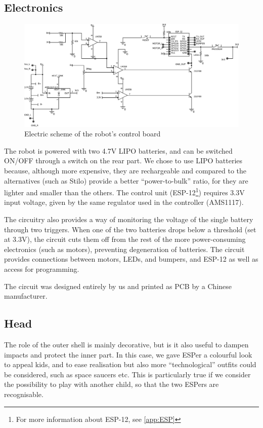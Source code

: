 \documentclass[a4paper,twoside]{book}
\begin{document}
\subsection{Electronics}

\begin{figure}[h]
\includegraphics[width=\textwidth]{img/ProgettoCircuito_bw}
\caption{Electric scheme of the robot's control board}
\label{fig:robot_circ}
\end{figure}

The robot is powered with two 4.7V LIPO batteries, and can be switched ON/OFF through a switch on the rear part. We chose to use LIPO batteries because, although more expensive, they are rechargeable and \textemdash{} compared to the alternatives (such as Stilo) \textemdash{} provide a better \textquotedblleft{}power-to-bulk\textquotedblright{}  ratio, for they are lighter and smaller than the others.
The control unit (ESP-12\footnote{For more information about ESP-12, see \autoref{app:ESP}}) requires 3.3V input voltage, given by the same regulator used in the controller (AMS1117).

The circuitry also provides a way of monitoring the voltage of the single battery through two triggers. When one of the two batteries drops below a threshold (set at 3.3V), the circuit cuts them off from the rest of the more power-consuming electronics (such as motors), preventing degeneration of batteries. The circuit provides connections between motors, LEDs, and bumpers, and ESP-12 as well as access for programming.

The circuit was designed entirely by us and printed as PCB by a Chinese manufacturer.

\subsection{Head}

The role of the outer shell is mainly decorative, but is it also useful to dampen impacts and protect the inner part. In this case, we gave ESPer a colourful look to appeal kids, and to ease realisation but also more \textquotedblleft{}technological\textquotedblright{} outfits could be considered, such as space saucers etc. This is particularly true if we consider the possibility to play with another child, so that the two ESPers are recognisable.
\end{document}
